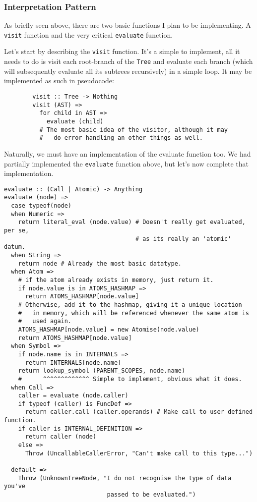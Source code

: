 \documentclass{article}
\newcommand{\code}[1]{\texttt{#1}}
\begin{document}
    \subsubsection{Interpretation Pattern}
      As briefly seen above, there are two basic functions I plan to be
      implementing.  A \code{visit} function and the very critical \code{evaluate}
      function.

      Let's start by describing the \code{visit} function. It's a simple to
      implement, all it needs to do is visit each root-branch of the \code{Tree}
      and evaluate each branch (which will subsequently evaluate all its
      subtrees recursively) in a simple loop. It may be implemented as such
      in pseudocode:

      \begin{verbatim}
        visit :: Tree -> Nothing
        visit (AST) =>
          for child in AST =>
            evaluate (child)
          # The most basic idea of the visitor, although it may
          #   do error handling an other things as well.
      \end{verbatim}

      Naturally, we must have an implementation of the evaluate function too.
      We had partially implemented the \code{evaluate} function above, but let's
      now complete that implementation.

      \clearpage

      \begin{verbatim}
evaluate :: (Call | Atomic) -> Anything
evaluate (node) =>
  case typeof(node)
  when Numeric =>
    return literal_eval (node.value) # Doesn't really get evaluated, per se,
                                     # as its really an 'atomic' datum.
  when String =>
    return node # Already the most basic datatype.
  when Atom =>
    # if the atom already exists in memory, just return it.
    if node.value is in ATOMS_HASHMAP =>
      return ATOMS_HASHMAP[node.value]
    # Otherwise, add it to the hashmap, giving it a unique location
    #   in memory, which will be referenced whenever the same atom is
    #   used again.
    ATOMS_HASHMAP[node.value] = new Atomise(node.value)
    return ATOMS_HASHMAP[node.value]
  when Symbol =>
    if node.name is in INTERNALS =>
      return INTERNALS[node.name]
    return lookup_symbol (PARENT_SCOPES, node.name)
    #      ^^^^^^^^^^^^^ Simple to implement, obvious what it does.
  when Call =>
    caller = evaluate (node.caller)
    if typeof (caller) is FuncDef =>
      return caller.call (caller.operands) # Make call to user defined function.
    if caller is INTERNAL_DEFINITION =>
      return caller (node)
    else =>
      Throw (UncallableCallerError, "Can't make call to this type...")

  default =>
    Throw (UnknownTreeNode, "I do not recognise the type of data you've
                             passed to be evaluated.")
      \end{verbatim}
\end{document}
